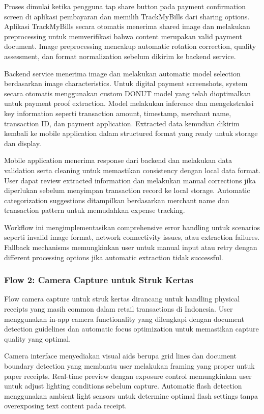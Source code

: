 Proses dimulai ketika pengguna tap share button pada payment confirmation screen di aplikasi pembayaran dan memilih TrackMyBills dari sharing options. Aplikasi TrackMyBills secara otomatis menerima shared image dan melakukan preprocessing untuk memverifikasi bahwa content merupakan valid payment document. Image preprocessing mencakup automatic rotation correction, quality assessment, dan format normalization sebelum dikirim ke backend service.

Backend service menerima image dan melakukan automatic model selection berdasarkan image characteristics. Untuk digital payment screenshots, system secara otomatis menggunakan custom DONUT model yang telah dioptimalkan untuk payment proof extraction. Model melakukan inference dan mengekstraksi key information seperti transaction amount, timestamp, merchant name, transaction ID, dan payment application. Extracted data kemudian dikirim kembali ke mobile application dalam structured format yang ready untuk storage dan display.

Mobile application menerima response dari backend dan melakukan data validation serta cleaning untuk memastikan consistency dengan local data format. User dapat review extracted information dan melakukan manual corrections jika diperlukan sebelum menyimpan transaction record ke local storage. Automatic categorization suggestions ditampilkan berdasarkan merchant name dan transaction pattern untuk memudahkan expense tracking.

Workflow ini mengimplementasikan comprehensive error handling untuk scenarios seperti invalid image format, network connectivity issues, atau extraction failures. Fallback mechanisms memungkinkan user untuk manual input atau retry dengan different processing options jika automatic extraction tidak successful.

\subsubsection{Flow 2: Camera Capture untuk Struk Kertas}
\label{subsubsec:flow-camera-receipt}

Flow camera capture untuk struk kertas dirancang untuk handling physical receipts yang masih common dalam retail transactions di Indonesia. User menggunakan in-app camera functionality yang dilengkapi dengan document detection guidelines dan automatic focus optimization untuk memastikan capture quality yang optimal.

Camera interface menyediakan visual aids berupa grid lines dan document boundary detection yang membantu user melakukan framing yang proper untuk paper receipts. Real-time preview dengan exposure control memungkinkan user untuk adjust lighting conditions sebelum capture. Automatic flash detection menggunakan ambient light sensors untuk determine optimal flash settings tanpa overexposing text content pada receipt.


